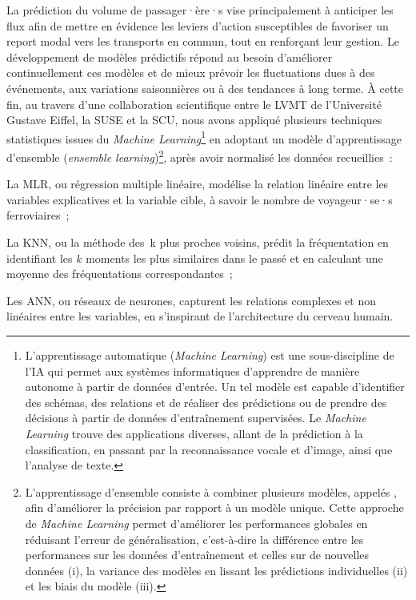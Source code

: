 \begin{refsegment}
La prédiction du volume de passager·ère·s vise principalement à anticiper les flux afin de mettre en évidence les leviers d’action susceptibles de favoriser un report modal vers les transports en commun, tout en renforçant leur gestion. Le développement de modèles prédictifs répond au besoin d’améliorer continuellement ces modèles et de mieux prévoir les fluctuations dues à des événements, aux variations saisonnières ou à des tendances à long terme. À cette fin, au travers d’une collaboration scientifique entre le \acrfull{LVMT} de l'Université Gustave Eiffel, la \acrfull{SUSE} et la \acrfull{SCU}, nous avons appliqué plusieurs techniques statistiques issues du \textsl{Machine Learning}\footnote{
    L’apprentissage automatique (\textsl{Machine Learning}) est une sous-discipline de l’\acrfull{IA} qui permet aux systèmes informatiques d’apprendre de manière autonome à partir de données d'entrée. Un tel modèle est capable d’identifier des schémas, des relations et de réaliser des prédictions ou de prendre des décisions à partir de données d’entraînement supervisées. Le \textsl{Machine Learning} trouve des applications diverses, allant de la prédiction à la classification, en passant par la reconnaissance vocale et d’image, ainsi que l’analyse de texte. 
} en adoptant un modèle d'apprentissage d'ensemble (\textsl{ensemble learning})\footnote{
    L’apprentissage d'ensemble consiste à combiner plusieurs modèles, appelés , afin d’améliorer la précision par rapport à un modèle unique. Cette approche de \textsl{Machine Learning} permet d’améliorer les performances globales en réduisant l’erreur de généralisation, c’est-à-dire la différence entre les performances sur les données d’entraînement et celles sur de nouvelles données (i), la variance des modèles en lissant les prédictions individuelles (ii) et les biais du modèle (iii).
}, après avoir normalisé les données recueillies~:
\begin{customitemize}
    \item La \acrfull{MLR}, ou régression multiple linéaire, modélise la relation linéaire entre les variables explicatives et la variable cible, à savoir le nombre de voyageur·se·s ferroviaires~;
    \item La \acrfull{KNN}, ou la méthode des~k plus proches voisins, prédit la fréquentation en identifiant les \(k\) moments les plus similaires dans le passé et en calculant une moyenne des fréquentations correspondantes~;
    \item Les \acrfull{ANN}, ou réseaux de neurones, capturent les relations complexes et non linéaires entre les variables, en s'inspirant de l'architecture du cerveau humain.
\end{customitemize}%


\end{refsegment}
